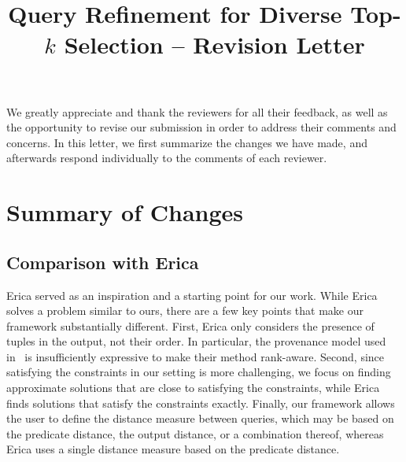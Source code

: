 \documentclass[main.tex]{subfile}
\begin{document}
\renewcommand\footnotetextcopyrightpermission[1]{}
\pagestyle{plain}

\title{Query Refinement for Diverse Top-$k$ Selection -- Revision Letter}

\renewcommand{\shortauthors}{}

\maketitle


We greatly appreciate and thank the reviewers for all their feedback, as well as the opportunity to revise our submission in order to address their comments and concerns. In this letter, we first summarize the changes we have made, and afterwards respond individually to the comments of each reviewer.

\section*{Summary of Changes}
\subsection*{Comparison with Erica \cite{ERICA}}
Erica served as an inspiration and a starting point for our work. While Erica solves a problem similar to ours, 
there are a few key points that make our framework substantially different. 
First, Erica only considers the presence of tuples in the output, not their order. In particular, the provenance model used in~\cite{ERICA} is insufficiently expressive to make their method rank-aware. 
Second, since satisfying the constraints in our setting is more challenging, we focus on finding approximate solutions that are close to satisfying the constraints, while Erica finds solutions that satisfy the constraints exactly. Finally, our framework allows the user to define the distance measure between queries, which may be based on the predicate distance, the output distance, or a combination thereof, whereas Erica uses a single distance measure based on the predicate distance.
\end{document}
